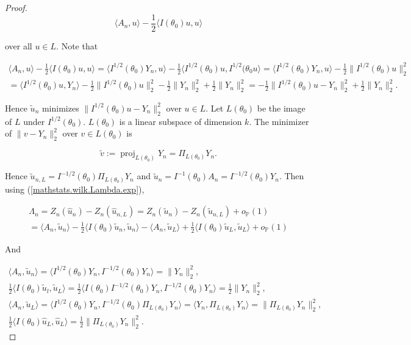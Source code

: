 \begin{proof}
\[
\langle A_n, u \rangle - \frac{1}{2} \langle I(\theta_0)u, u \rangle
\]

over all \(u \in L\). Note that 

\begin{multline*}
\langle A_n, u \rangle - \frac{1}{2} \langle I(\theta_0)u, u \rangle = \langle I^{1/2}(\theta_0) Y_n, u \rangle - \frac{1}{2} \langle I^{1/2}(\theta_0)u, I^{1/2}(\theta_0 u \rangle =  \langle I^{1/2}(\theta_0) Y_n, u \rangle - \frac{1}{2} \lVert I^{1/2}(\theta_0) u \rVert_2^2  
\\ =  \langle I^{1/2}(\theta_0) u, Y_n \rangle - \frac{1}{2} \lVert I^{1/2}(\theta_0) u \rVert_2^2  - \frac{1}{2} \lVert Y_n \rVert_2^2 + \frac{1}{2} \lVert Y_n \rVert_2^2 = - \frac{1}{2} \lVert I^{1/2}(\theta_0) u - Y_n \rVert_2^2 + \frac{1}{2} \lVert Y_n \rVert_2^2.
\end{multline*}

Hence \(\tilde{u}_n\) minimizes \( \lVert I^{1/2}(\theta_0) u - Y_n \rVert_2^2 \) over \(u \in L\). Let \(L(\theta_0)\) be the image of \(L\) under \(I^{1/2}(\theta_0)\). \(L(\theta_0)\) is a linear subspace of dimension \(k\). The minimizer of \(\lVert v - Y_n \rVert_2^2\) over \(v \in L(\theta_0)\) is 

\[
\tilde{v} := \operatorname{proj}_{L(\theta_0)} Y_n = \Pi_{L(\theta_0)} Y_n.
\]

Hence \(\tilde{u}_{n,L} = I^{-1/2} (\theta_0) \Pi_{L(\theta_0)} Y_n \) and \(\tilde{u}_n = I^{-1}(\theta_0) A_n = I^{-1/2}(\theta_0) Y_n\). Then using (\ref{mathstats.wilk.Lambda.exp}),

\begin{multline*}
\Lambda_n = Z_n(\hat{u}_n) - Z_n(\hat{u}_{n,L}) =  Z_n(\tilde{u}_n) - Z_n(\tilde{u}_{n,L}) + o_{\mathbb{P}}(1)
\\  = \langle A_n, \tilde{u}_n \rangle - \frac{1}{2} \langle I(\theta_0) \tilde{u}_n, \tilde{u}_n \rangle - \langle A_n, \tilde{u}_L \rangle + \frac{1}{2} \langle I(\theta_0) \tilde{u}_L, \tilde{u}_L \rangle + o_{\mathbb{P}}(1)
\end{multline*}

And

\begin{multline*}
 \langle A_n, \tilde{u}_n \rangle =  \langle I^{1/2} (\theta_0) Y_n ,  I^{-1/2} (\theta_0) Y_n \rangle = \lVert Y_n \rVert_2^2,
 \\ \frac{1}{2} \langle I(\theta_0) \tilde{u}_l, \tilde{u}_L \rangle = \frac{1}{2} \langle I(\theta_0) I^{-1/2}(\theta_0)Y_n,  I^{-1/2}(\theta_0)Y_n \rangle = \frac{1}{2} \lVert Y_n \rVert_2^2,
 \\ \langle A_n, \tilde{u}_L \rangle =  \langle I^{1/2} (\theta_0) Y_n , I^{-1/2} (\theta_0) \Pi_{L(\theta_0)} Y_n \rangle = \langle Y_n, \Pi_{L(\theta_0)} Y_n \rangle = \lVert \Pi_{L(\theta_0)} Y_n \rVert_2^2 ,
 \\ \frac{1}{2} \langle I(\theta_0) \hat{u}_L, \hat{u}_L \rangle = \frac{1}{2} \lVert \Pi_{L(\theta_0)} Y_n \rVert_2^2.
\end{multline*}


\end{proof}

